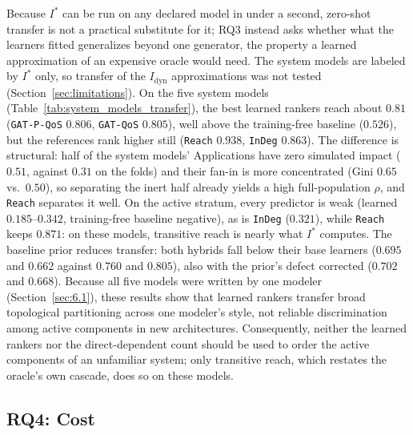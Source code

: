 Because $I^*$ can be run on any declared model in under a second, zero-shot transfer is not a practical substitute for it; RQ3 instead asks whether what the learners fitted generalizes beyond one generator, the property a learned approximation of an expensive oracle would need. The system models are labeled by $I^*$ only, so transfer of the $I_{\text{dyn}}$ approximations was not tested (Section~\ref{sec:limitations}). On the five system models (Table~\ref{tab:system_models_transfer}), the best learned rankers reach about $0.81$ (\texttt{GAT-P-QoS} $0.806$, \texttt{GAT-QoS} $0.805$), well above the training-free baseline ($0.526$), but the references rank higher still (\texttt{Reach} $0.938$, \texttt{InDeg} $0.863$). The difference is structural: half of the system models' Applications have zero simulated impact ($0.51$, against $0.31$ on the folds) and their fan-in is more concentrated (Gini $0.65$ vs.\ $0.50$), so separating the inert half already yields a high full-population $\rho$, and \texttt{Reach} separates it well. On the active stratum, every predictor is weak (learned $0.185$--$0.342$, training-free baseline negative), as is \texttt{InDeg} ($0.321$), while \texttt{Reach} keeps $0.871$: on these models, transitive reach is nearly what $I^*$ computes. The baseline prior reduces transfer: both hybrids fall below their base learners ($0.695$ and $0.662$ against $0.760$ and $0.805$), also with the prior's defect corrected ($0.702$ and $0.668$). Because all five models were written by one modeler (Section~\ref{sec:6.1}), these results show that learned rankers transfer broad topological partitioning across one modeler's style, not reliable discrimination among active components in new architectures. Consequently, neither the learned rankers nor the direct-dependent count should be used to order the active components of an unfamiliar system; only transitive reach, which restates the oracle's own cascade, does so on these models.

\subsection{RQ4: Cost}
\label{sec:rq4}

